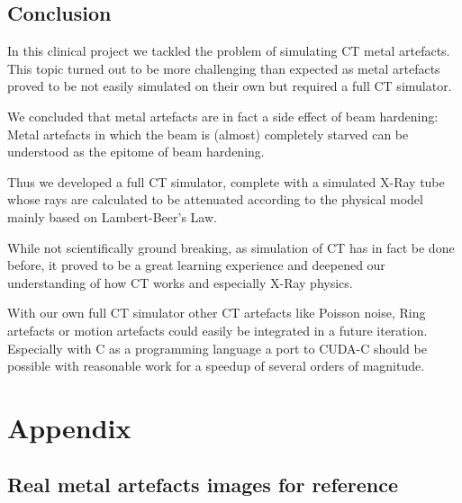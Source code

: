 \chapter{Conclusion}
\par In this clinical project we tackled the problem of simulating CT metal artefacts. This topic turned out to be more challenging than expected as metal artefacts proved to be not easily simulated on their own but required a full CT simulator.
\par We concluded that metal artefacts are in fact a side effect of beam hardening: Metal artefacts in which the beam is (almost) completely starved can be understood as the epitome of beam  hardening.
\par Thus we developed a full CT simulator, complete with a simulated X-Ray tube whose rays are calculated to be attenuated according to the physical model mainly based on Lambert-Beer's Law.
\par While not scientifically ground breaking, as simulation of CT has in fact be done before, it proved to be a great learning experience and deepened our understanding of how CT works and especially X-Ray physics.
\par With our own full CT simulator other CT artefacts like Poisson noise, Ring artefacts or motion artefacts could easily be integrated in a future iteration. Especially with C as a programming language a port to CUDA-C should be possible with reasonable work for a speedup of several orders of magnitude.



%
%
\part*{Appendix}

\appendix %
\chapter{Real metal artefacts images for reference}
\label{chapter:RealMetal}

